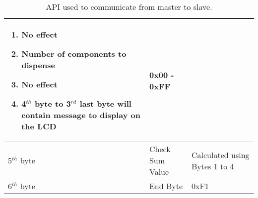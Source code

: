 \documentclass[a4paper,11pt]{article}
\numberwithin{figure}{section}
\numberwithin{table}{section}
\begin{document}
\begin{center}
\begin{table}[ht]
\begin{tabular}{| m{3cm} | m{5cm}| m{5cm} |}
\begin{enumerate}
																				\setlength{\itemsep}{0pt}
   																				\setlength{\parskip}{0pt}
    																			\setlength{\parsep}{0pt} 
																				\item No effect
																				\item Number of components to dispense
																				\item No effect
																				\item 4$^{th}$ byte to 3$^{rd}$ last byte will contain message to display on the LCD
																			\end{enumerate}	 & 0x00 - 0xFF \\
			\hline
			5$^{th}$ byte & Check Sum Value & Calculated using Bytes 1 to 4 \\
			\hline
			6$^{th}$ byte & End Byte & 0xF1 \\
			\hline
			\end{tabular}
			\caption{API used to communicate from master to slave. \label{tab:M2SAPI}}
		\end{table}
	\end{center}
	\newpage
\end{document}
